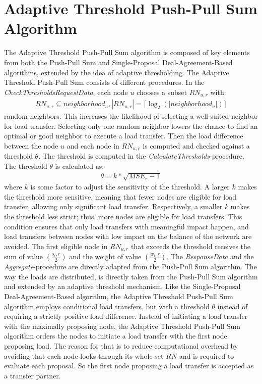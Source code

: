 \section{Adaptive Threshold Push-Pull Sum Algorithm}\label{sec:adaptivethresholdPPS}
The Adaptive Threshold Push-Pull Sum algorithm is composed of key elements from both the Push-Pull Sum and Single-Proposal Deal-Agreement-Based algorithms, extended by the idea of adaptive thresholding. The Adaptive Threshold Push-Pull Sum consists of different procedures. In the \textit{CheckThresholdsRequestData}, each node $u$ chooses a subset $RN_{u,r}$ with:
\begin{align}
    RN_{u,r} \subseteq neighborhood_{u}, |RN_{u,r}|=\lceil \log_{2}{(|neighborhood_{u}|)} \rceil
\end{align}
random neighbors. This increases the likelihood of selecting a well-suited neighbor for load transfer. Selecting only one random neighbor lowers the chance to find an optimal or good neighbor to execute a load transfer. Then the load difference between the node $u$ and each node in $RN_{u,r}$ is computed and checked against a threshold $\theta$. The threshold is computed in the \textit{CalculateThresholds}-procedure. The threshold $\theta$ is calculated as:
\begin{align}
    \theta = k*\sqrt{MSE_r-1}    
\end{align}
where $k$ is some factor to adjust the sensitivity of the threshold. A larger $k$ makes the threshold more sensitive, meaning that fewer nodes are eligible for load transfer, allowing only significant load transfer. Respectively, a smaller $k$ makes the threshold less strict; thus, more nodes are eligible for load transfers. This condition ensures that only load transfers with meaningful impact happen, and load transfers between nodes with low impact on the balance of the network are avoided. The first eligible node in $RN_{u,r}$ that exceeds the threshold receives the sum of value $(\frac{s_i,r}{2})$ and the weight of value $(\frac{w_i,r}{2})$. The \textit{ResponseData} and the \textit{Aggregate}-procedure are directly adapted from the Push-Pull Sum algorithm. The way the loads are distributed, is directly taken from the Push-Pull Sum algorithm and extended by an adaptive threshold mechanism. Like the Single-Proposal Deal-Agreement-Based algorithm, the Adaptive Threshold Push-Pull Sum algorithm employs conditional load transfers, but with a threshold $\theta$ instead of requiring a strictly positive load difference. Instead of initiating a load transfer with the maximally proposing node, the Adaptive Threshold Push-Pull Sum algorithm orders the nodes to initiate a load transfer with the first node proposing load. The reason for that is to reduce computational overhead by avoiding that each node looks through its whole set $RN$ and is required to evaluate each proposal. So the first node proposing a load transfer is accepted as a transfer partner.

